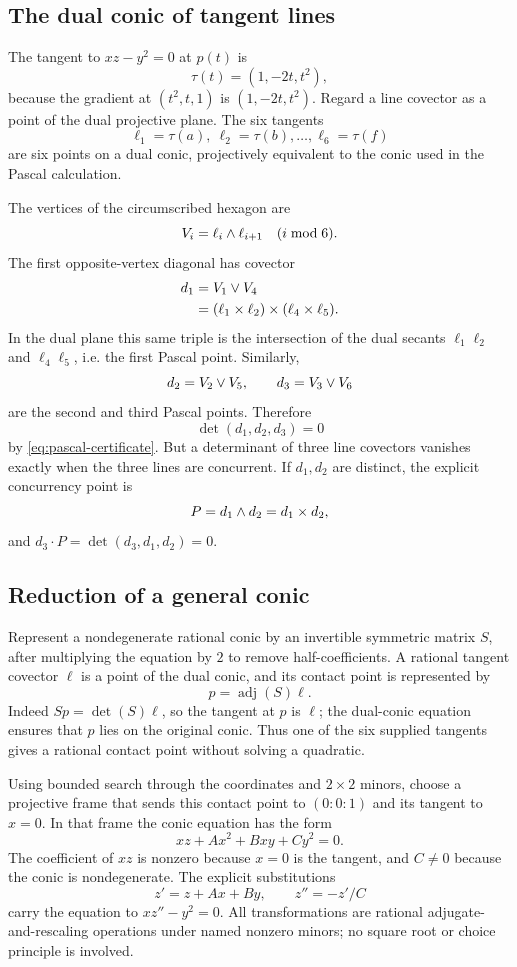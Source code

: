 \subsection{The dual conic of tangent lines}

The tangent to $xz-y^2=0$ at $p(t)$ is
\begin{equation}\label{eq:tangent-line}
 \tau(t)=(1,-2t,t^2),
\end{equation}
because the gradient at $(t^2,t,1)$ is $(1,-2t,t^2)$.  Regard a line covector
as a point of the dual projective plane.  The six tangents
\[
 \ell_1=\tau(a),\ \ell_2=\tau(b),\ldots,\ell_6=\tau(f)
\]
are six points on a dual conic, projectively equivalent to the conic used in
the Pascal calculation.

The vertices of the circumscribed hexagon are
\[
 V_i=\ell_i\mathbin{\wedge}\ell_{i+1}
 \quad(i\bmod 6).
\]
The first opposite-vertex diagonal has covector
\begin{align*}
 d_1
  &=V_1\mathbin{\vee} V_4\\
  &=(\ell_1\mathbin{\times}\ell_2)\mathbin{\times}(\ell_4\mathbin{\times}\ell_5).
\end{align*}
In the dual plane this same triple is the intersection of the dual secants
$\ell_1\ell_2$ and $\ell_4\ell_5$, i.e. the first Pascal point.  Similarly,
\[
 d_2=V_2\mathbin{\vee} V_5,
 \qquad d_3=V_3\mathbin{\vee} V_6
\]
are the second and third Pascal points.  Therefore
\[
 \det(d_1,d_2,d_3)=0
\]
by \eqref{eq:pascal-certificate}.  But a determinant of three line covectors
vanishes exactly when the three lines are concurrent.  If $d_1,d_2$ are
distinct, the explicit concurrency point is
\[
 P=d_1\mathbin{\wedge} d_2=d_1\mathbin{\times} d_2,
\]
and $d_3\cdot P=\det(d_3,d_1,d_2)=0$.

\subsection{Reduction of a general conic}

Represent a nondegenerate rational conic by an invertible symmetric matrix
$S$, after multiplying the equation by $2$ to remove half-coefficients.  A
rational tangent covector $\ell$ is a point of the dual conic, and its contact
point is represented by
\[
 p=\operatorname{adj}(S)\ell.
\]
Indeed $Sp=\det(S)\ell$, so the tangent at $p$ is $\ell$; the dual-conic
equation ensures that $p$ lies on the original conic.  Thus one of the six
supplied tangents gives a rational contact point without solving a quadratic.

Using bounded search through the coordinates and $2\times2$ minors, choose a
projective frame that sends this contact point to $(0:0:1)$ and its tangent to
$x=0$.  In that frame the conic equation has the form
\[
 xz+A x^2+Bxy+C y^2=0.
\]
The coefficient of $xz$ is nonzero because $x=0$ is the tangent, and $C\ne0$
because the conic is nondegenerate.  The explicit substitutions
\[
 z'=z+Ax+By,
 \qquad z''=-z'/C
\]
carry the equation to $xz''-y^2=0$.  All transformations are rational
adjugate-and-rescaling operations under named nonzero minors; no square root
or choice principle is involved.

